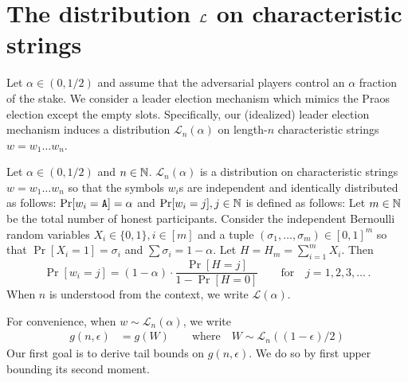 





\section{\texorpdfstring{The distribution $\mathcal{L}$}{A distribution} on characteristic strings}\label{sec:Lalpha-praos}

Let $\alpha \in (0, 1/2)$ 
and assume that the adversarial players control an $\alpha$ 
fraction of the stake. 
We consider a leader election mechanism 
which mimics the Praos election except the empty slots. 
Specifically, 
our (idealized) leader election mechanism 
induces 
a distribution $\mathcal{L}_n(\alpha)$ 
on length-$n$ characteristic strings $w = w_1 \ldots w_n$. 

\begin{definition}\label{def:dist-L-alpha-praos}
  Let $\alpha \in (0,1/2)$ and $n \in \mathbb{N}$. 
  $\mathcal{L}_n(\alpha)$ is a distribution on characteristic strings 
  $w = w_1 \ldots w_n$ so that 
  the symbols $w_i$s are independent and identically distributed as follows: 
  $\Pr[w_i = \mathtt{A}] = \alpha$ and 
  $\Pr[w_i = j], j \in \mathbb{N}$ is defined as follows: 
  Let $m \in \mathbb{N}$ be the total number of honest participants. 
  Consider the independent Bernoulli random variables $X_i \in \{0, 1\}, i \in [m]$ 
  and a tuple $(\sigma_1, \ldots, \sigma_m) \in [0,1]^m$ 
  so that $\Pr[X_i = 1] = \sigma_i$ 
  and $\sum \sigma_i = 1 - \alpha$. 
  Let $H = H_m = \sum_{i =1}^m X_i$. 
  Then 
  $$
    \Pr[w_i = j] = (1-\alpha)\cdot
      \frac{\Pr[H = j]}{1 - \Pr[H = 0]}
      \qquad \text{for}\quad j = 1,2,3,\ldots
      \,.
  $$
  When $n$ is understood from the context, 
  we write $\mathcal{L}(\alpha)$. 
\end{definition}

For convenience, when $w \sim \mathcal{L}_n(\alpha)$, we write
\begin{align}
  g(n,\epsilon) &= g(W) \qquad \text{where} \quad W \sim \mathcal{L}_n((1-\epsilon)/2) \label{eq:praos-gneps}
\end{align}
\noindent 
Our first goal is to derive tail bounds on $g(n,\epsilon)$. 
We do so by first upper bounding its second moment.




